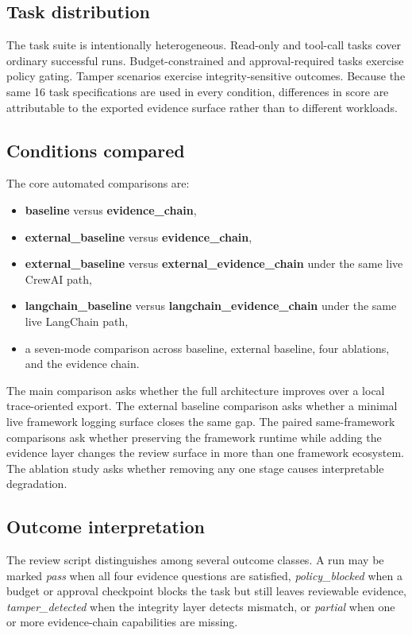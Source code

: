\subsection{Task distribution}

The task suite is intentionally heterogeneous. Read-only and tool-call tasks cover ordinary successful runs. Budget-constrained and approval-required tasks exercise policy gating. Tamper scenarios exercise integrity-sensitive outcomes. Because the same 16 task specifications are used in every condition, differences in score are attributable to the exported evidence surface rather than to different workloads.

\subsection{Conditions compared}

The core automated comparisons are:

\begin{itemize}
  \item \textbf{baseline} versus \textbf{evidence\_chain},
  \item \textbf{external\_baseline} versus \textbf{evidence\_chain},
  \item \textbf{external\_baseline} versus \textbf{external\_evidence\_chain} under the same live CrewAI path,
  \item \textbf{langchain\_baseline} versus \textbf{langchain\_evidence\_chain} under the same live LangChain path,
  \item a seven-mode comparison across baseline, external baseline, four ablations, and the evidence chain.
\end{itemize}

The main comparison asks whether the full architecture improves over a local trace-oriented export. The external baseline comparison asks whether a minimal live framework logging surface closes the same gap. The paired same-framework comparisons ask whether preserving the framework runtime while adding the evidence layer changes the review surface in more than one framework ecosystem. The ablation study asks whether removing any one stage causes interpretable degradation.

\subsection{Outcome interpretation}

The review script distinguishes among several outcome classes. A run may be marked \emph{pass} when all four evidence questions are satisfied, \emph{policy\_blocked} when a budget or approval checkpoint blocks the task but still leaves reviewable evidence, \emph{tamper\_detected} when the integrity layer detects mismatch, or \emph{partial} when one or more evidence-chain capabilities are missing.

